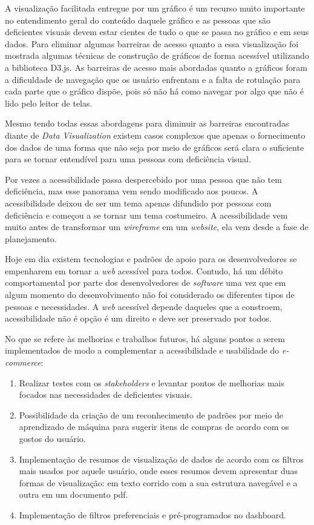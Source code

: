 {A visualização facilitada entregue por um gráfico é um recurso muito importante no entendimento geral do conteúdo daquele gráfico e as pessoas que são deficientes visuais devem estar cientes de tudo o que se passa no gráfico e em seus dados. Para eliminar algumas barreiras de acesso quanto a essa visualização foi mostrada algumas técnicas de construção de gráficos de forma acessível utilizando a biblioteca D3.js. As barreiras de acesso mais abordadas quanto a gráficos foram a dificuldade de navegação que os usuário enfrentam e a falta de rotulação para cada parte que o gráfico dispõe, pois só não há como navegar por algo que não é lido pelo leitor de telas.

Mesmo tendo todas essas abordagens para diminuir as barreiras encontradas diante de \textit{Data Visualization} existem casos complexos que apenas o fornecimento dos dados de uma forma que não seja por meio de gráficos será clara o suficiente para se tornar entendível para uma pessoas com deficiência visual.

Por vezes a acessibilidade passa despercebido por uma pessoa que não tem deficiência, mas esse panorama vem sendo modificado aos poucos. A acessibilidade deixou de ser um tema apenas difundido por pessoas com deficiência e começou a se tornar um tema costumeiro. A acessibilidade vem muito antes de transformar um \textit{wireframe} em um \textit{website}, ela vem desde a fase de planejamento.


Hoje em dia existem tecnologias e padrões de apoio para os desenvolvedores se empenharem em tornar a \textit{web} acessível para todos. Contudo, há um débito comportamental por parte dos desenvolvedores de \textit{software} uma vez que em algum momento do desenvolvimento não foi considerado os diferentes tipos de pessoas e necessidades. A \textit{web} acessível depende daqueles que a constroem, acessibilidade não é opção é um direito e deve ser preservado por todos.  


No que se refere às melhorias e trabalhos futuros, há alguns pontos a serem implementados de modo a complementar a acessibilidade e usabilidade do \textit{e-commerce}: 
\begin{enumerate}
    \item Realizar testes com os \textit{stakeholders} e levantar pontos de melhorias mais focados nas necessidades de deficientes visuais. 
    \item Possibilidade da criação de um reconhecimento de padrões por meio de aprendizado de máquina para sugerir itens de compras de acordo com os gostos do usuário. 
    \item Implementação de resumos de visualização de dados de acordo com os filtros mais usados por aquele usuário, onde esses resumos devem apresentar duas formas de visualização: em texto corrido com a sua estrutura navegável e a outra em um documento pdf. 
    \item Implementação de filtros preferenciais e pré-programados no dashboard. 
\end{enumerate}
}